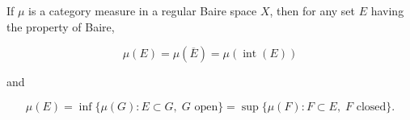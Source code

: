 If $\mu$ is a category measure in a regular Baire space $X$, then for any set $E$ having the property of Baire,

$$\mu(E) = \mu(\overline{E}) = \mu(\operatorname{int}(E))$$

and

$$\mu(E) = \inf\{\mu(G) : E \subset G,\; G \text{ open}\} = \sup\{\mu(F) : F \subset E,\; F \text{ closed}\}.$$

